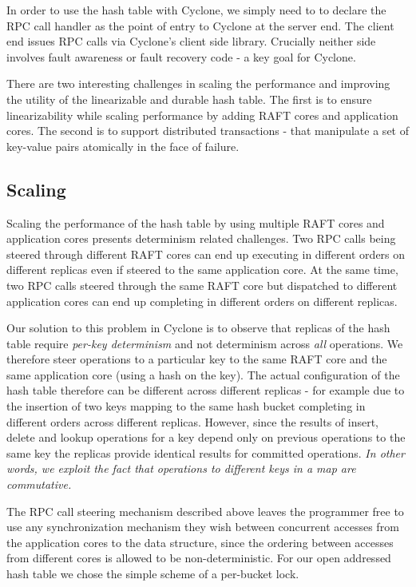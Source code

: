 \documentclass[10pt, preprint]{sigplanconf}
\begin{document}
In order to use the hash table with Cyclone, we simply need to to declare the
RPC call handler as the point of entry to Cyclone at the server end.  The client
end issues RPC calls via Cyclone's client side library. Crucially neither side
involves fault awareness or fault recovery code - a key goal for Cyclone.

There are two interesting challenges in scaling the performance and improving
the utility of the linearizable and durable hash table. The first is to ensure
linearizability while scaling performance by adding RAFT cores and application
cores. The second is to support distributed transactions - that manipulate a set
of key-value pairs atomically in the face of failure.

\subsection{Scaling}
Scaling the performance of the hash table by using multiple RAFT cores and
application cores presents determinism related challenges. Two RPC calls being
steered through different RAFT cores can end up executing in different orders on
different replicas even if steered to the same application core. At the same time,
two RPC calls steered through the same RAFT core but dispatched to different
application cores can end up completing in different orders on different replicas.

Our solution to this problem in Cyclone is to observe that replicas of the hash
table require \emph{per-key determinism} and not determinism across \emph{all}
operations. We therefore steer operations to a particular key to the same RAFT
core and the same application core (using a hash on the key).  The actual
configuration of the hash table therefore can be different across different
replicas - for example due to the insertion of two keys mapping to the same hash
bucket completing in different orders across different replicas. However, since
the results of insert, delete and lookup operations for a key depend only on
previous operations to the same key the replicas provide identical results for
committed operations. \emph{In other words, we exploit the fact that operations to
different keys in a map are commutative.}

The RPC call steering mechanism described above leaves the programmer free to
use any synchronization mechanism they wish between concurrent accesses from the
application cores to the data structure, since the ordering between accesses
from different cores is allowed to be non-deterministic. For our open addressed
hash table we chose the simple scheme of a per-bucket lock.
\end{document}
